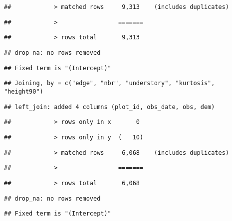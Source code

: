 \documentclass[
]{article}
\begin{document}
\begin{verbatim}
##            > matched rows     9,313    (includes duplicates)
\end{verbatim}

\begin{verbatim}
##            >                 =======
\end{verbatim}

\begin{verbatim}
##            > rows total       9,313
\end{verbatim}

\begin{verbatim}
## drop_na: no rows removed
\end{verbatim}

\begin{verbatim}
## Fixed term is "(Intercept)"
\end{verbatim}

\begin{verbatim}
## Joining, by = c("edge", "nbr", "understory", "kurtosis", "height90")
\end{verbatim}

\begin{verbatim}
## left_join: added 4 columns (plot_id, obs_date, obs, dem)
\end{verbatim}

\begin{verbatim}
##            > rows only in x       0
\end{verbatim}

\begin{verbatim}
##            > rows only in y  (   10)
\end{verbatim}

\begin{verbatim}
##            > matched rows     6,068    (includes duplicates)
\end{verbatim}

\begin{verbatim}
##            >                 =======
\end{verbatim}

\begin{verbatim}
##            > rows total       6,068
\end{verbatim}

\begin{verbatim}
## drop_na: no rows removed
\end{verbatim}

\begin{verbatim}
## Fixed term is "(Intercept)"
\end{verbatim}
\end{document}
